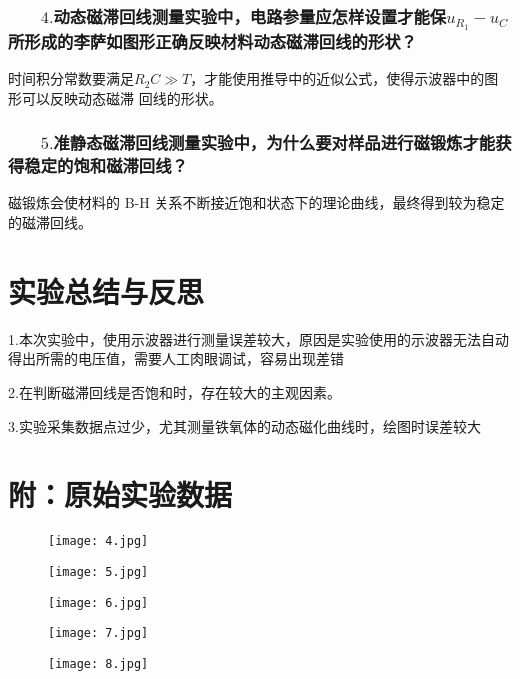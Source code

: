 \documentclass[12pt,a4paper]{article}
\begin{document}
    \subsubsection*{$\qquad4.$动态磁滞回线测量实验中，电路参量应怎样设置才能保$u_{R_1}-u_C$所形成的李萨如图形正确反映材料动态磁滞回线的形状？}
    时间积分常数要满足$R_2 C\gg T$，才能使用推导中的近似公式，使得示波器中的图形可以反映动态磁滞
回线的形状。

    \subsubsection*{$\qquad5.$准静态磁滞回线测量实验中，为什么要对样品进行磁锻炼才能获得稳定的饱和磁滞回线？}
    磁锻炼会使材料的 B-H 关系不断接近饱和状态下的理论曲线，最终得到较为稳定的磁滞回线。
\section{实验总结与反思}
1.本次实验中，使用示波器进行测量误差较大，原因是实验使用的示波器无法自动得出所需的电压值，需要人工肉眼调试，容易出现差错

2.在判断磁滞回线是否饱和时，存在较大的主观因素。

3.实验采集数据点过少，尤其测量铁氧体的动态磁化曲线时，绘图时误差较大

\section*{附：原始实验数据}
\begin{figure}[H]
    \centering
    \texttt{[image: 4.jpg]}
\end{figure}
\begin{figure}[H]
    \centering
    \texttt{[image: 5.jpg]}
\end{figure}
\begin{figure}[H]
    \centering
    \texttt{[image: 6.jpg]}
\end{figure}
\begin{figure}[H]
    \centering
    \texttt{[image: 7.jpg]}
\end{figure}
\begin{figure}[H]
    \centering
    \texttt{[image: 8.jpg]}
\end{figure}
\end{document}
